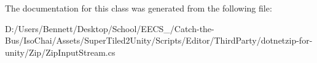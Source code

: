 The documentation for this class was generated from the following file\+:\begin{DoxyCompactItemize}
\item 
D\+:/\+Users/\+Bennett/\+Desktop/\+School/\+E\+E\+C\+S\+\_/\+Catch-\/the-\/\+Bus/\+Iso\+Chai/\+Assets/\+Super\+Tiled2\+Unity/\+Scripts/\+Editor/\+Third\+Party/dotnetzip-\/for-\/unity/\+Zip/Zip\+Input\+Stream.\+cs\end{DoxyCompactItemize}
